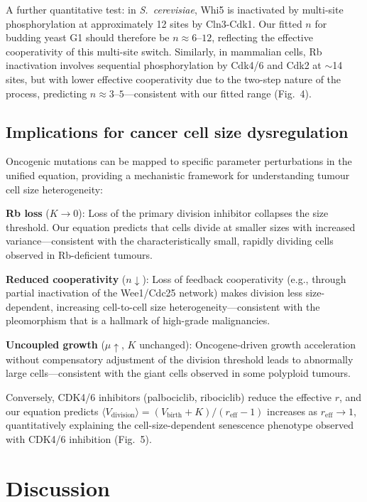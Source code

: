 \documentclass[11pt]{article}
\newcommand{\Vbirth}{V_{\text{birth}}}
\newcommand{\Vdiv}{V_{\text{division}}}
\newcommand{\Scerevisiae}{\textit{S.~cerevisiae}}
\begin{document}
A further quantitative test: in \Scerevisiae{}, Whi5 is inactivated
by multi-site phosphorylation at approximately 12 sites by
Cln3-Cdk1\cite{schmoller2015}.  Our fitted $n$ for budding yeast
G1 should therefore be $n \approx 6\text{--}12$, reflecting the
effective cooperativity of this multi-site switch.  Similarly, in
mammalian cells, Rb inactivation involves sequential
phosphorylation by Cdk4/6 and Cdk2 at $\sim$14 sites, but with
lower effective cooperativity due to the two-step nature of the
process, predicting $n \approx 3\text{--}5$---consistent with our
fitted range (Fig.~4).

\subsection*{Implications for cancer cell size dysregulation}

Oncogenic mutations can be mapped to specific parameter perturbations
in the unified equation, providing a mechanistic framework for
understanding tumour cell size heterogeneity:

\textbf{Rb loss} ($K \to 0$): Loss of the primary division inhibitor
collapses the size threshold.  Our equation predicts that cells
divide at smaller sizes with increased variance---consistent with the
characteristically small, rapidly dividing cells observed in
Rb-deficient tumours.

\textbf{Reduced cooperativity} ($n \downarrow$): Loss of feedback
cooperativity (e.g., through partial inactivation of the
Wee1/Cdc25 network) makes division less size-dependent, increasing
cell-to-cell size heterogeneity---consistent with the pleomorphism
that is a hallmark of high-grade malignancies.

\textbf{Uncoupled growth} ($\mu \uparrow$, $K$ unchanged):
Oncogene-driven growth acceleration without compensatory adjustment
of the division threshold leads to abnormally large cells---consistent
with the giant cells observed in some polyploid tumours.

Conversely, CDK4/6 inhibitors (palbociclib, ribociclib) reduce
the effective $r$, and our equation predicts
$\langle\Vdiv\rangle = (\Vbirth + K)/(r_{\mathrm{eff}} - 1)$
increases as $r_{\mathrm{eff}} \to 1$, quantitatively explaining
the cell-size-dependent senescence phenotype observed with CDK4/6
inhibition\cite{neurohr2019} (Fig.~5).

\section*{Discussion}
\end{document}
